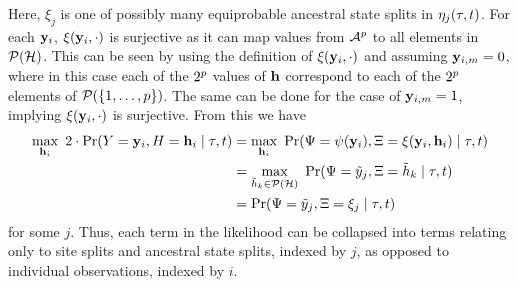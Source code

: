 Here, $\xi_j$ is one of possibly many equiprobable ancestral state splits in $\eta_j(\tau, t)$.
For each $\mathbf{y}_i$, $\xi(\mathbf{y}_i, \cdot)$ is surjective as it can map values from $\mathcal{A}^p$ to all elements in $\mathcal{P}(\mathcal{H})$.
This can be seen by using the definition of $\xi(\mathbf{y}_i, \cdot)$ and assuming $\mathbf{y}_{i,m}=0$, where in this case each of the $2^p$ values of $\mathbf{h}$ correspond to each of the $2^p$ elements of $\mathcal{P}(\{1,\ldots,p\})$.
The same can be done for the case of $\mathbf{y}_{i,m}=1$, implying $\xi(\mathbf{y}_i, \cdot)$ is surjective.
From this we have
\begin{align*}
    \max_{\ancestralStateColumn_i} \ 2\cdot\Pr(\alignmentColumnRV=\alignmentColumn_i, \ancestralStateColumnRV=\ancestralStateColumn_i \mid \tau, t) &= \max_{\ancestralStateColumn_i} \ \Pr(\siteSplitRV=\patternToSplit(\alignmentColumn_i), \ancestralSplitRV=\ancestralToSplit(\alignmentColumn_i, \ancestralStateColumn_i) \mid \tau, t)\\
    &= \max_{\ancestralSplit_k\in\mathcal{P}(\ancestralSplitSet)} \ \Pr(\siteSplitRV=\siteSplit_j, \ancestralSplitRV=\ancestralSplit_k \mid \tau, t)\\
    &= \Pr(\siteSplitRV=\siteSplit_j, \ancestralSplitRV = \xi_j \mid \tau, t)
\end{align*}
for some $j$.
Thus, each term in the likelihood can be collapsed into terms relating only to site splits and ancestral state splits, indexed by $j$, as opposed to individual observations, indexed by $i$.


